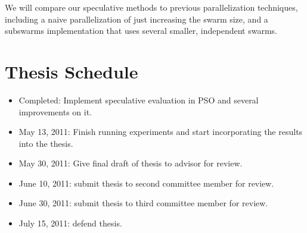 \documentclass[ms]{byuprop}
\begin{document}
We will compare our speculative methods to previous parallelization techniques,
including a naive parallelization of just increasing the swarm size, and a
subswarms implementation that uses several smaller, independent swarms.

\section{Thesis Schedule}

\begin{itemize}

\item Completed: Implement speculative evaluation in PSO and several
  improvements on it.

\item May 13, 2011: Finish running experiments and start incorporating the
  results into the thesis.
  
\item May 30, 2011: Give final draft of thesis to advisor for review.

\item June 10, 2011: submit thesis to second committee member for review.

\item June 30, 2011: submit thesis to third committee member for review.

\item July 15, 2011: defend thesis.

\end{itemize}



\renewcommand\bibsection{\section{Annotated Bibliography}}


\end{document}
